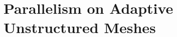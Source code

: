 \section{Parallelism on Adaptive Unstructured Meshes}

%
\frame
{
  \Large
  \begin{block}{}
  \end{block}
}





